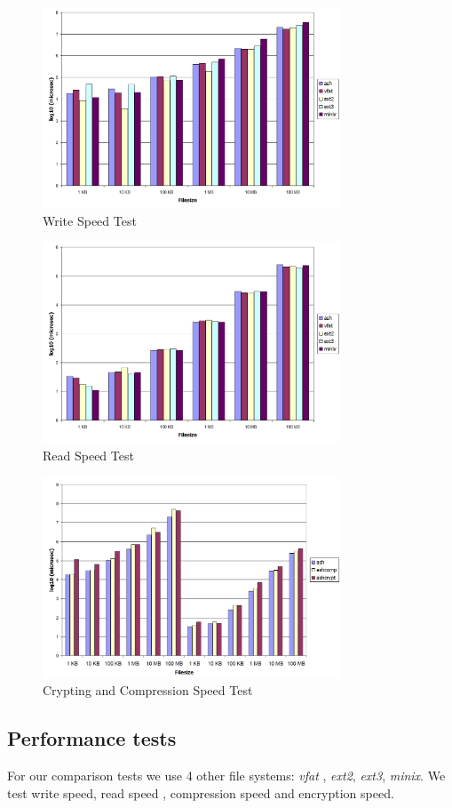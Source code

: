 \documentclass[conference]{IEEEtran}
\begin{document}
\begin{figure}[!t]
\centering
\includegraphics[width=3.5in]{writetest.jpg}
\caption{Write Speed Test}
\label{fig_wspeed}
\end{figure}

\begin{figure}[!t]
\centering
\includegraphics[width=3.5in]{readtest.jpg}
\caption{Read Speed Test}
\label{fig_rspeed}
\end{figure}

\begin{figure}[!t]
\centering
\includegraphics[width=3.5in]{features.jpg}
\caption{Crypting and Compression Speed Test}
\label{fig_fspeed}
\end{figure}


\subsection{Performance tests}
For our comparison tests we use 4 other file systems: {\em vfat } , {\em ext2}, {\em ext3}, {\em minix}. We test write speed, 
read speed , compression speed and encryption speed. \\
\end{document}
